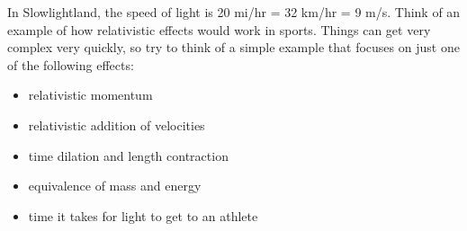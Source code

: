 In Slowlightland, the speed of light is 20 mi/hr = 32 km/hr = 9 m/s. Think of an example of how
relativistic effects would work in sports. Things can get very complex very quickly, so try to think of a
simple example that focuses on just one of the following effects:
\begin{itemize}
 \item[] relativistic momentum
 \item[] relativistic addition of velocities
 \item[] time dilation and length contraction
 \item[] equivalence of mass and energy
 \item[] time it takes for light to get to an athlete
\end{itemize}
